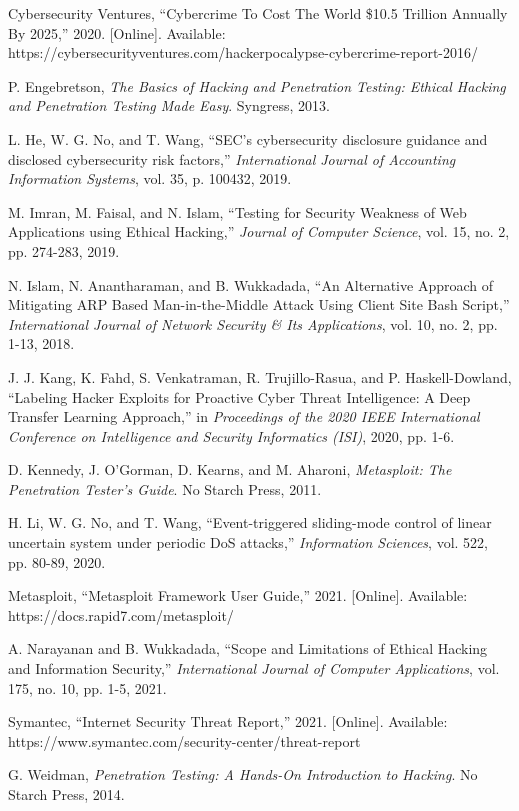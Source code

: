 \documentclass[journal,twoside]{IEEEtran}
\begin{document}
\begin{thebibliography}{00}
 Cybersecurity Ventures, ``Cybercrime To Cost The World \$10.5 Trillion Annually By 2025,'' 2020. [Online]. Available: https://cybersecurityventures.com/hackerpocalypse-cybercrime-report-2016/

 P. Engebretson, \textit{The Basics of Hacking and Penetration Testing: Ethical Hacking and Penetration Testing Made Easy}. Syngress, 2013.

 L. He, W. G. No, and T. Wang, ``SEC's cybersecurity disclosure guidance and disclosed cybersecurity risk factors,'' \textit{International Journal of Accounting Information Systems}, vol. 35, p. 100432, 2019.

 M. Imran, M. Faisal, and N. Islam, ``Testing for Security Weakness of Web Applications using Ethical Hacking,'' \textit{Journal of Computer Science}, vol. 15, no. 2, pp. 274-283, 2019.

 N. Islam, N. Anantharaman, and B. Wukkadada, ``An Alternative Approach of Mitigating ARP Based Man-in-the-Middle Attack Using Client Site Bash Script,'' \textit{International Journal of Network Security \& Its Applications}, vol. 10, no. 2, pp. 1-13, 2018.

 J. J. Kang, K. Fahd, S. Venkatraman, R. Trujillo-Rasua, and P. Haskell-Dowland, ``Labeling Hacker Exploits for Proactive Cyber Threat Intelligence: A Deep Transfer Learning Approach,'' in \textit{Proceedings of the 2020 IEEE International Conference on Intelligence and Security Informatics (ISI)}, 2020, pp. 1-6.

 D. Kennedy, J. O'Gorman, D. Kearns, and M. Aharoni, \textit{Metasploit: The Penetration Tester's Guide}. No Starch Press, 2011.

 H. Li, W. G. No, and T. Wang, ``Event-triggered sliding-mode control of linear uncertain system under periodic DoS attacks,'' \textit{Information Sciences}, vol. 522, pp. 80-89, 2020.

 Metasploit, ``Metasploit Framework User Guide,'' 2021. [Online]. Available: https://docs.rapid7.com/metasploit/

 A. Narayanan and B. Wukkadada, ``Scope and Limitations of Ethical Hacking and Information Security,'' \textit{International Journal of Computer Applications}, vol. 175, no. 10, pp. 1-5, 2021.

 Symantec, ``Internet Security Threat Report,'' 2021. [Online]. Available: https://www.symantec.com/security-center/threat-report

 G. Weidman, \textit{Penetration Testing: A Hands-On Introduction to Hacking}. No Starch Press, 2014.

\end{thebibliography}
\end{document}
